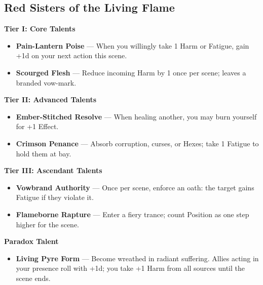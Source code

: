 \documentclass[11pt]{book}
\begin{document}
\subsection*{Red Sisters of the Living Flame}
\begin{tcolorbox}[colback=mistgray!10,colframe=emberred,title={Red Sisters of the Living Flame --- Talents}]

\textbf{Tier I: Core Talents}
\begin{itemize}[noitemsep]
  \item \textbf{Pain-Lantern Poise} --- When you willingly take 1 Harm or Fatigue, gain +1d on your next action this scene.
  \item \textbf{Scourged Flesh} --- Reduce incoming Harm by 1 once per scene; leaves a branded vow-mark.
\end{itemize}

\textbf{Tier II: Advanced Talents}
\begin{itemize}[noitemsep]
  \item \textbf{Ember-Stitched Resolve} --- When healing another, you may burn yourself for +1 Effect.
  \item \textbf{Crimson Penance} --- Absorb corruption, curses, or Hexes; take 1 Fatigue to hold them at bay.
\end{itemize}

\textbf{Tier III: Ascendant Talents}
\begin{itemize}[noitemsep]
  \item \textbf{Vowbrand Authority} --- Once per scene, enforce an oath: the target gains Fatigue if they violate it.
  \item \textbf{Flameborne Rapture} --- Enter a fiery trance; count Position as one step higher for the scene.
\end{itemize}

\textbf{Paradox Talent}
\begin{itemize}[noitemsep]
  \item \textbf{Living Pyre Form} --- Become wreathed in radiant suffering. Allies acting in your presence roll with +1d; you take +1 Harm from all sources until the scene ends.
\end{itemize}

\end{tcolorbox}
\end{document}
